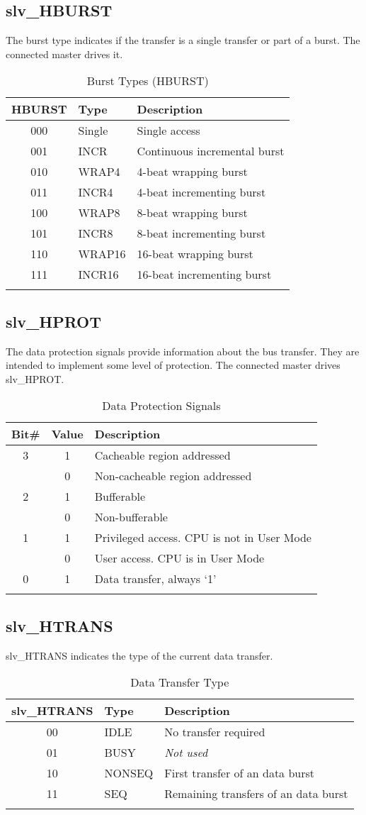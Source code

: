 \subsection{slv\_HBURST}\label{slv_hburst}

The burst type indicates if the transfer is a single transfer or part of
a burst. The connected master drives it.

\begin{longtable}[]{@{}cll@{}}
\toprule
HBURST & Type & Description\tabularnewline
\midrule
\endhead
000 & Single & Single access\tabularnewline
001 & INCR & Continuous incremental burst\tabularnewline
010 & WRAP4 & 4-beat wrapping burst\tabularnewline
011 & INCR4 & 4-beat incrementing burst\tabularnewline
100 & WRAP8 & 8-beat wrapping burst\tabularnewline
101 & INCR8 & 8-beat incrementing burst\tabularnewline
110 & WRAP16 & 16-beat wrapping burst\tabularnewline
111 & INCR16 & 16-beat incrementing burst\tabularnewline
\bottomrule
\caption{Burst Types (HBURST)}
\end{longtable}

\subsection{slv\_HPROT}\label{slv_hprot}

The data protection signals provide information about the bus transfer.
They are intended to implement some level of protection. The connected
master drives slv\_HPROT.

\begin{longtable}[]{@{}ccl@{}}
\toprule
Bit\# & Value & Description\tabularnewline
\midrule
\endhead
3 & 1 & Cacheable region addressed\tabularnewline
& 0 & Non-cacheable region addressed\tabularnewline
2 & 1 & Bufferable\tabularnewline
& 0 & Non-bufferable\tabularnewline
1 & 1 & Privileged access. CPU is not in User Mode\tabularnewline
& 0 & User access. CPU is in User Mode\tabularnewline
0 & 1 & Data transfer, always `1'\tabularnewline
\bottomrule
\caption{Data Protection Signals}
\end{longtable}

\subsection{slv\_HTRANS}\label{slv_htrans}

slv\_HTRANS indicates the type of the current data transfer.

\begin{longtable}[]{@{}cll@{}}
\toprule
slv\_HTRANS & Type & Description\tabularnewline
\midrule
\endhead
00 & IDLE & No transfer required\tabularnewline
01 & BUSY & \emph{Not used}\tabularnewline
10 & NONSEQ & First transfer of an data burst\tabularnewline
11 & SEQ & Remaining transfers of an data burst\tabularnewline
\bottomrule
\caption{Data Transfer Type}
\end{longtable}

